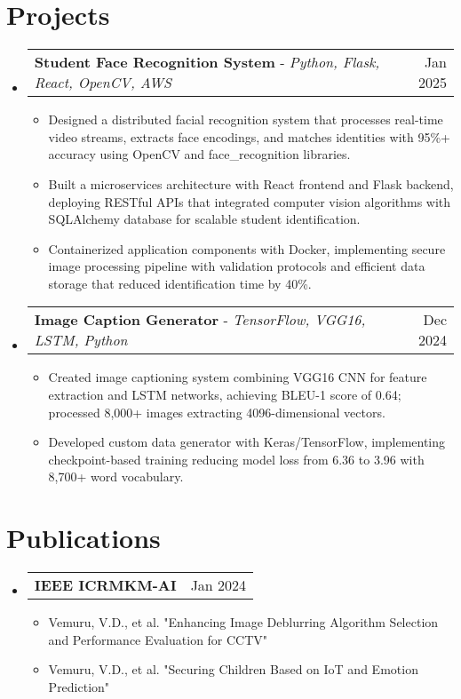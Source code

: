 \documentclass[letterpaper,10pt]{article}
\makeatletter
\newcommand{\resumeItem}[1]{
  \item\small{
    {#1 \vspace{-3pt}}
  }
}
\newcommand{\resumeProjectHeading}[2]{
    \item
    \begin{tabular*}{0.97\textwidth}{l@{\extracolsep{\fill}}r}
      \small#1 & #2 \\
    \end{tabular*}\vspace{-5pt}
}
\newcommand{\resumePublicationsHeading}[2]{
    \item
    \begin{tabular*}{0.97\textwidth}{l@{\extracolsep{\fill}}r}
      \small#1 & #2 \\
    \end{tabular*}\vspace{-6pt}
}
\newcommand{\resumeSubHeadingListStart}{\begin{itemize}[leftmargin=*]}
\newcommand{\resumeSubHeadingListEnd}{\end{itemize}}
\newcommand{\resumeItemListStart}{\begin{itemize}}
\newcommand{\resumeItemListEnd}{\end{itemize}\vspace{-6pt}}
\makeatother
\begin{document}
\section{Projects}
    \resumeSubHeadingListStart
      \resumeProjectHeading
          {\textbf{Student Face Recognition System} - \emph{Python, Flask, React, OpenCV, AWS}}{Jan 2025}
          \resumeItemListStart
            \resumeItem{Designed a distributed facial recognition system that processes real-time video streams, extracts face encodings, and matches identities with 95\%+ accuracy using OpenCV and face\_recognition libraries.}
            \resumeItem{Built a microservices architecture with React frontend and Flask backend, deploying RESTful APIs that integrated computer vision algorithms with SQLAlchemy database for scalable student identification.}
            \resumeItem{Containerized application components with Docker, implementing secure image processing pipeline with validation protocols and efficient data storage that reduced identification time by 40\%.}
          \resumeItemListEnd
      \resumeProjectHeading
          {\textbf{Image Caption Generator} - \emph{TensorFlow, VGG16, LSTM, Python}}{Dec 2024}
          \resumeItemListStart
            \resumeItem{Created image captioning system combining VGG16 CNN for feature extraction and LSTM networks, achieving BLEU-1 score of 0.64; processed 8,000+ images extracting 4096-dimensional vectors.}
            \resumeItem{Developed custom data generator with Keras/TensorFlow, implementing checkpoint-based training reducing model loss from 6.36 to 3.96 with 8,700+ word vocabulary.}
          \resumeItemListEnd
    \resumeSubHeadingListEnd

\section{Publications}
    \resumeSubHeadingListStart
      \resumePublicationsHeading
          {\textbf{IEEE ICRMKM-AI}}{Jan 2024}
          \resumeItemListStart
            \resumeItem{Vemuru, V.D., et al. "Enhancing Image Deblurring Algorithm Selection and Performance Evaluation for CCTV"}
            \resumeItem{Vemuru, V.D., et al. "Securing Children Based on IoT and Emotion Prediction"}
          \resumeItemListEnd
    \resumeSubHeadingListEnd
\end{document}

